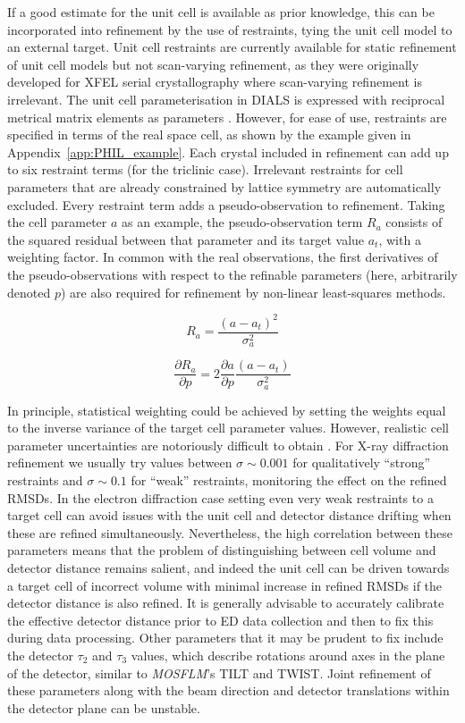\documentclass[preprint]{iucr}
\newcommand{\mosflm}{\emph{MOSFLM}\xspace}
\newcommand{\pder}[2][]{\frac{\partial#1}{\partial#2}}
\begin{document}
If a good estimate for the unit cell is available as prior knowledge, this can
be incorporated into refinement by the use of restraints, tying the unit cell
model to an external target. Unit cell restraints are currently available for
static refinement of unit cell models but not scan-varying refinement, as they
were originally developed for XFEL serial crystallography where scan-varying
refinement is irrelevant. The unit cell parameterisation in DIALS is expressed
with reciprocal metrical matrix elements as parameters \cite{Waterman2016}.
However, for ease of use, restraints are specified in terms of the real space
cell, as shown by the example given in Appendix~\ref{app:PHIL_example}. Each
crystal included in refinement can add up to six restraint terms (for the
triclinic case). Irrelevant restraints for cell parameters that are already
constrained by lattice symmetry are automatically excluded. Every restraint
term adds a pseudo-observation to refinement. Taking the cell parameter $a$ as
an example, the pseudo-observation term $R_a$ consists of the squared residual
between that parameter and its target value $a_t$, with a weighting factor. In
common with the real observations, the first derivatives of the
pseudo-observations with respect to the refinable parameters (here, arbitrarily
denoted $p$) are also required for refinement by non-linear least-squares
methods.

\begin{equation}
\label{eq:restraint_to_target}
R_a = \frac{\left( a - a_t \right)^2}{\sigma_a^2}
\end{equation}

\begin{equation}
\pder[R_a]{p} = 2 \pder[a]{p} \frac{\left( a - a_t \right)}{\sigma_a^2}
\end{equation}

In principle, statistical weighting could be achieved by
setting the weights equal to the inverse variance of the target cell parameter
values. However, realistic cell parameter uncertainties are notoriously
difficult to obtain \cite{Dauter2015}. For X-ray diffraction refinement we
usually try values between $\sigma \sim 0.001$ for qualitatively ``strong''
restraints and $\sigma \sim 0.1$ for ``weak'' restraints, monitoring the
effect on the refined RMSDs. In the electron diffraction case setting even very
weak restraints to a target cell can avoid issues with the unit cell and
detector distance drifting when these are refined simultaneously. Nevertheless,
the high correlation between these parameters means that the problem of
distinguishing between cell volume and detector distance remains salient, and
indeed the unit cell can be driven towards a target cell of incorrect volume
with minimal increase in refined RMSDs if the detector distance is also
refined. It is generally advisable to accurately calibrate the effective
detector distance prior to ED data collection and then to fix this during
data processing. Other parameters that it may be prudent to fix include the
detector $\tau_2$ and $\tau_3$ values, which describe rotations around axes in
the plane of the detector, similar to \mosflm's TILT and TWIST. Joint refinement
of these parameters along with the beam direction and detector translations
within the detector plane can be unstable.
\end{document}
